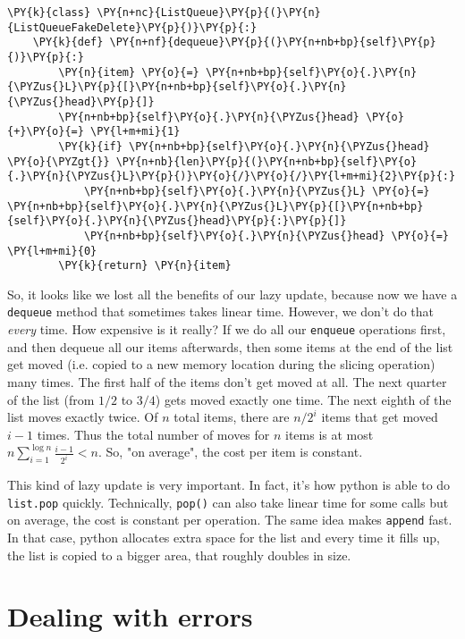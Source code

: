 \begin{Verbatim}[commandchars=\\\{\}]
\PY{k}{class} \PY{n+nc}{ListQueue}\PY{p}{(}\PY{n}{ListQueueFakeDelete}\PY{p}{)}\PY{p}{:}
    \PY{k}{def} \PY{n+nf}{dequeue}\PY{p}{(}\PY{n+nb+bp}{self}\PY{p}{)}\PY{p}{:}
        \PY{n}{item} \PY{o}{=} \PY{n+nb+bp}{self}\PY{o}{.}\PY{n}{\PYZus{}L}\PY{p}{[}\PY{n+nb+bp}{self}\PY{o}{.}\PY{n}{\PYZus{}head}\PY{p}{]}
        \PY{n+nb+bp}{self}\PY{o}{.}\PY{n}{\PYZus{}head} \PY{o}{+}\PY{o}{=} \PY{l+m+mi}{1}
        \PY{k}{if} \PY{n+nb+bp}{self}\PY{o}{.}\PY{n}{\PYZus{}head} \PY{o}{\PYZgt{}} \PY{n+nb}{len}\PY{p}{(}\PY{n+nb+bp}{self}\PY{o}{.}\PY{n}{\PYZus{}L}\PY{p}{)}\PY{o}{/}\PY{o}{/}\PY{l+m+mi}{2}\PY{p}{:}
            \PY{n+nb+bp}{self}\PY{o}{.}\PY{n}{\PYZus{}L} \PY{o}{=} \PY{n+nb+bp}{self}\PY{o}{.}\PY{n}{\PYZus{}L}\PY{p}{[}\PY{n+nb+bp}{self}\PY{o}{.}\PY{n}{\PYZus{}head}\PY{p}{:}\PY{p}{]}
            \PY{n+nb+bp}{self}\PY{o}{.}\PY{n}{\PYZus{}head} \PY{o}{=} \PY{l+m+mi}{0}
        \PY{k}{return} \PY{n}{item}
\end{Verbatim}



So, it looks like we lost all the benefits of our lazy update, because now we have a \texttt{dequeue} method that sometimes takes linear time.  However, we don't do that \emph{every} time.  How expensive is it really?  If we do all our \texttt{enqueue} operations first, and then dequeue all our items afterwards, then some items at the end of the list get moved (i.e. copied to a new memory location during the slicing operation) many times.  The first half of the items don't get moved at all.  The next quarter of the list (from $1/2$ to $3/4$) gets moved exactly one time.  The next eighth of the list moves exactly twice.  Of $n$ total items, there are $n/2^i$ items that get moved $i-1$ times.  Thus the total number of moves for $n$ items is at most $n\sum_{i=1}^{\log n} \frac{i-1}{2^i} < n$.  So, "on average",  the cost per item is constant.  


This kind of lazy update is very important.  In fact, it's how python is able to do \texttt{list.pop} quickly.  Technically, \texttt{pop()} can also take linear time for some calls but on average, the cost is constant per operation.  The same idea makes \texttt{append} fast.  In that case, python allocates extra space for the list and every time it fills up, the list is copied to a bigger area, that roughly doubles in size.

\section{Dealing with errors}


